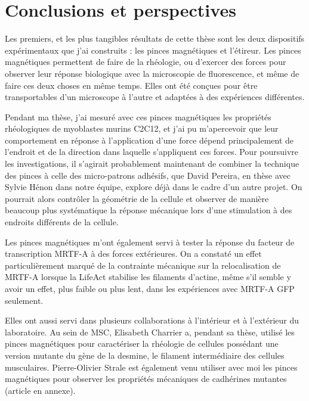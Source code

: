 %
%
%
%

\chapter*{Conclusions et perspectives}

 Les premiers, et les plus tangibles résultats de cette thèse sont les deux dispositifs expérimentaux que j'ai construits : les pinces magnétiques et l'étireur. Les pinces magnétiques permettent de faire de la rhéologie, ou d'exercer des forces pour observer leur réponse biologique avec la microscopie de fluorescence, et même de faire ces deux choses en même temps. Elles ont été conçues pour être transportables d'un microscope à l'autre et adaptées à des expériences différentes. 
  
 Pendant ma thèse, j'ai mesuré avec ces pinces magnétiques les propriétés rhéologiques de myoblastes murins C2C12, et j'ai pu m'apercevoir que leur comportement en réponse à l'application d'une force dépend principalement de l'endroit et de la direction dans laquelle s'appliquent ces forces. Pour poursuivre les investigations, il s'agirait probablement maintenant de combiner la technique des pinces à celle des micro-patrons adhésifs, que David Pereira, en thèse avec Sylvie Hénon dans notre équipe, explore déjà dans le cadre d'un autre projet. On pourrait alors contrôler la géométrie de la cellule et observer de manière beaucoup plus systématique la réponse mécanique lors d'une stimulation à des endroits différents de la cellule. 

Les pinces magnétiques m'ont également servi à tester la réponse du facteur de transcription MRTF-A à des forces extérieures. On a constaté un effet particulièrement marqué de la contrainte mécanique sur la relocalisation de MRTF-A lorsque la LifeAct stabilise les filaments d'actine, même s'il semble y avoir un effet, plus faible ou plus lent, dans les expériences avec MRTF-A GFP seulement. 

Elles ont aussi servi dans plusieurs collaborations à l'intérieur et à l'extérieur du laboratoire. Au sein de MSC, Elisabeth Charrier a, pendant sa thèse, utilisé les pinces magnétiques pour caractériser la rhéologie de cellules possédant une version mutante du gène de la desmine, le filament intermédiaire des cellules musculaires. Pierre-Olivier Strale est également venu utiliser avec moi les pinces magnétiques pour observer les propriétés mécaniques de cadhérines mutantes (article en annexe). 

